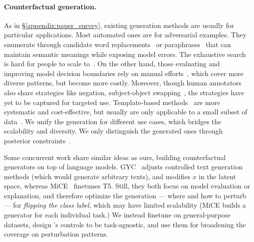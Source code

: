 \paragraph{Counterfactual generation.}
As in \S\ref{appendix:paper_survey}, existing generation methods are usually for particular applications.
Most automated ones are for adversarial examples. 
They enumerate through candidate word replacements~\cite{alzantot2018generating, garg2020bae} or paraphrases~\cite{iyyer2018adversarial, malandrakis-etal-2019-controlled} that can maintain semantic meanings while exposing model errors.
The exhaustive search is hard for people to scale to~\cite{ribeiro2018sear}.
On the other hand, those evaluating and improving model decision boundaries rely on manual efforts~\cite{checklist:acl20}, which cover more diverse patterns, but become more costly.
Moreover, though human annotators also share strategies like negation, subject-object swapping~\cite{kaushik2019learning, gardner2020contrast}, the strategies have yet to be captured for targeted use.
Template-based methods~\cite{mccoy2019right, nie2019analyzing} are more systematic and cost-effective, but usually are only applicable to a small subset of data~\cite{li2020linguistically}.
We unify the generation for different use cases, which bridges the scalability and diversity.
We only distinguish the generated ones through posterior constraints~\cite{morris2020textattack, alzantot-etal-2018-generating}.

Some concurrent work share similar ideas as ours, building counterfactual generators on top of language models.
GYC~\cite{madaan2020generate} adjusts controlled text generation methods (which would generate arbitrary texts), and modifies $x$ in the latent space, whereas MiCE~\cite{ross2020explaining} finetunes T5.
Still, they both focus on model evaluation or explanation, and therefore optimize the generation --- where and how to perturb --- for \emph{flipping the class label}, which may have limited scalability (\eg MiCE builds a generator for each individual task.)
We instead finetune \sysname on general-purpose datasets, design \sysname's controls to be task-agnostic, and use them for broadening the coverage on perturbation patterns.






